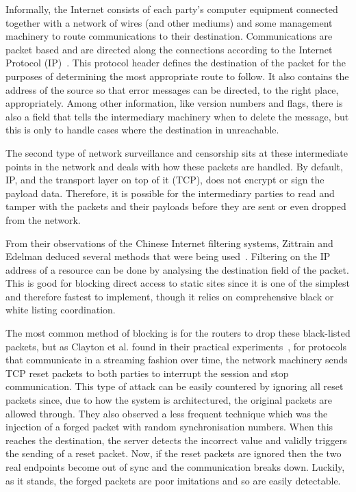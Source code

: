 \documentclass[ %
                    author={Samuel Russell},
                supervisor={Prof. Bogdan Warinschi},
                    degree={MEng},
                     title={Innocuous Ciphertexts},
                  subtitle={The DE-CENSOR Scheme},
                      type={research},
                      year={2018} ]{dissertation}
\begin{document}
Informally, the Internet consists of each party's computer equipment connected together with a network of wires (and other mediums) and some management machinery to route communications to their destination.
Communications are packet based and are directed along the connections according to the Internet Protocol (IP)~\cite{ip4}.
This protocol header defines the destination of the packet for the purposes of determining the most appropriate route to follow.
It also contains the address of the source so that error messages can be directed, to the right place, appropriately.
Among other information, like version numbers and flags, there is also a field that tells the intermediary machinery when to delete the message, but this is only to handle cases where the destination in unreachable. 

The second type of network surveillance and censorship sits at these intermediate points in the network and deals with how these packets are handled. By default, IP, and the transport layer on top of it (TCP), does not encrypt or sign the payload data. Therefore, it is possible for the intermediary parties to read and tamper with the packets and their payloads before they are sent or even dropped from the network. 

From their observations of the Chinese Internet filtering systems, Zittrain and Edelman deduced several methods that were being used~\cite{edelman2005empirical}.
Filtering on the IP address of a resource can be done by analysing the destination field of the packet. This is good for blocking direct access to static sites since it  is one of the simplest and therefore fastest to implement, though it relies on comprehensive black or white listing coordination.

The most common method of blocking is for the routers to drop these black-listed packets, but as Clayton et al. found in their practical experiments~\cite{clayton2006ignoring}, for protocols that communicate in a streaming fashion over time, the network machinery sends TCP reset packets to both parties to interrupt the session and stop communication. This type of attack can be easily countered by ignoring all reset packets since, due to how the system is architectured, the original packets are allowed through. They also observed a less frequent technique which was the injection of a forged packet with random synchronisation numbers. When this reaches the destination, the server detects the incorrect value and validly triggers the sending of a reset packet. Now, if the reset packets are ignored then the two real endpoints become out of sync and the communication breaks down. Luckily, as it stands, the forged packets are poor imitations and so are easily detectable.
\end{document}
